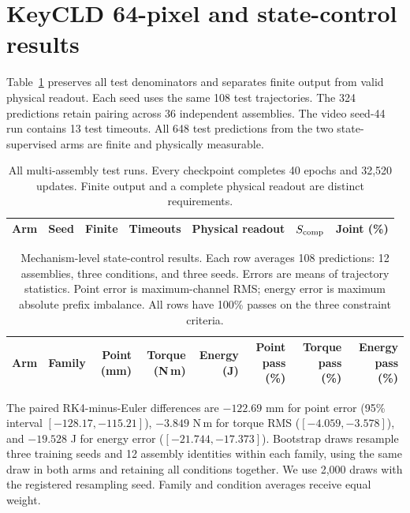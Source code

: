 \documentclass[10pt,twocolumn,letterpaper]{article}
\begin{document}
\section{KeyCLD 64-pixel and state-control results}
\label{app:corpus-results}
Table~\ref{app:corpus-seeds} preserves all test denominators and separates finite output from valid physical readout. Each seed uses the same 108 test trajectories. The 324 predictions retain pairing across 36 independent assemblies. The video seed-44 run contains 13 test timeouts. All 648 test predictions from the two state-supervised arms are finite and physically measurable.

\begin{table}[t]
\caption{All multi-assembly test runs. Every checkpoint completes 40 epochs and 32,520 updates. Finite output and a complete physical readout are distinct requirements.}
\label{app:corpus-seeds}
\centering\small
\begin{tabular}{lrrrrrr}
\toprule
Arm & Seed & Finite & Timeouts & Physical readout & $S_{\rm comp}$ & Joint (\%)\\
\midrule

\bottomrule
\end{tabular}
\end{table}

\begin{table}[t]
\caption{Mechanism-level state-control results. Each row averages 108 predictions: 12 assemblies, three conditions, and three seeds. Errors are means of trajectory statistics. Point error is maximum-channel RMS; energy error is maximum absolute prefix imbalance. All rows have 100\% passes on the three constraint criteria.}
\label{app:corpus-families}
\centering\small
\begin{tabular}{llrrrrrr}
\toprule
Arm & Family & Point (mm) & Torque (N\,m) & Energy (J) & Point pass (\%) & Torque pass (\%) & Energy pass (\%)\\
\midrule

\bottomrule
\end{tabular}
\end{table}

The paired RK4-minus-Euler differences are $-122.69$ mm for point error (95\% interval $[-128.17,-115.21]$), $-3.849$ N\,m for torque RMS ($[-4.059,-3.578]$), and $-19.528$ J for energy error ($[-21.744,-17.373]$). Bootstrap draws resample three training seeds and 12 assembly identities within each family, using the same draw in both arms and retaining all conditions together. We use 2,000 draws with the registered resampling seed. Family and condition averages receive equal weight.
\end{document}
